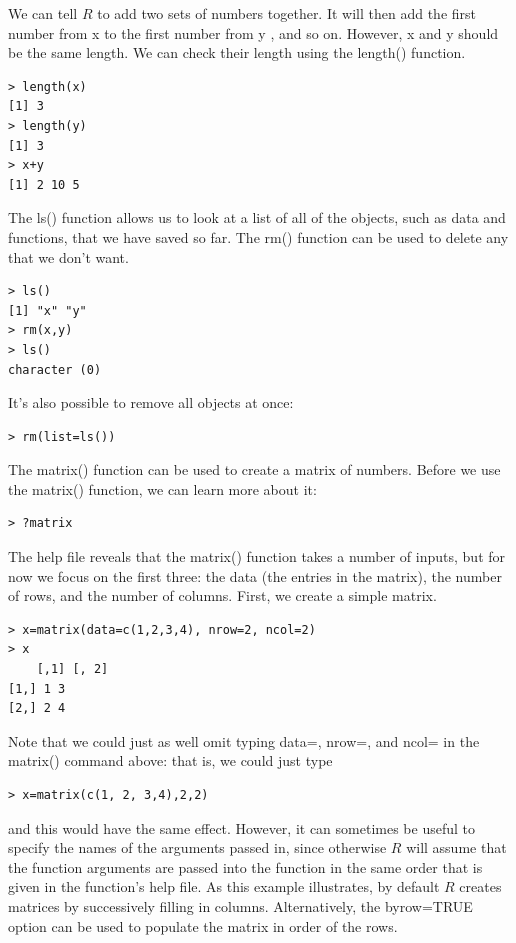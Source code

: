 \documentclass[10pt]{article}
\begin{document}
We can tell $R$ to add two sets of numbers together. It will then add the first number from x to the first number from y , and so on. However, x and y should be the same length. We can check their length using the length() function.

\begin{verbatim}
> length(x)
[1] 3
> length(y)
[1] 3
> x+y
[1] 2 10 5
\end{verbatim}

The ls() function allows us to look at a list of all of the objects, such as data and functions, that we have saved so far. The rm() function can be used to delete any that we don't want.

\begin{verbatim}
> ls()
[1] "x" "y"
> rm(x,y)
> ls()
character (0)
\end{verbatim}

It's also possible to remove all objects at once:

\begin{verbatim}
> rm(list=ls())
\end{verbatim}

The matrix() function can be used to create a matrix of numbers. Before we use the matrix() function, we can learn more about it:

\begin{verbatim}
> ?matrix
\end{verbatim}

The help file reveals that the matrix() function takes a number of inputs, but for now we focus on the first three: the data (the entries in the matrix), the number of rows, and the number of columns. First, we create a simple matrix.

\begin{verbatim}
> x=matrix(data=c(1,2,3,4), nrow=2, ncol=2)
> x
    [,1] [, 2]
[1,] 1 3
[2,] 2 4
\end{verbatim}

Note that we could just as well omit typing data=, nrow=, and ncol= in the matrix() command above: that is, we could just type

\begin{verbatim}
> x=matrix(c(1, 2, 3,4),2,2)
\end{verbatim}

and this would have the same effect. However, it can sometimes be useful to specify the names of the arguments passed in, since otherwise $R$ will assume that the function arguments are passed into the function in the same order that is given in the function's help file. As this example illustrates, by default $R$ creates matrices by successively filling in columns. Alternatively, the byrow=TRUE option can be used to populate the matrix in order of the rows.
\end{document}
